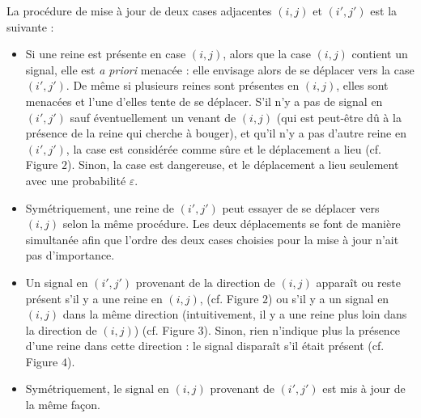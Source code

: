 \documentclass[11pt, openany]{article}
\newcommand{\norm}[1]{\left\lVert#1\right\rVert}
\begin{document}
La procédure de mise à jour de deux cases adjacentes $(i,j)$  et $(i', j')$
 est la suivante : \begin{itemize} 


\item{ Si une reine est présente en case $(i,j)$, alors que la case $(i,j)$ contient un signal, elle est \emph{a priori} menacée : elle envisage alors de se déplacer vers la case $(i',j')$. De même si plusieurs reines sont présentes en $(i,j)$, elles sont menacées et l'une d'elles tente de se déplacer. S'il n'y a pas de signal en $(i',j')$ sauf éventuellement un venant de $(i,j)$ (qui est peut-être dû à la présence de la reine qui cherche à bouger), et qu'il n'y a pas d'autre reine en $(i',j')$, la case est considérée comme sûre et le déplacement a lieu (cf. Figure $2$). Sinon, la case est dangereuse, et le déplacement a lieu seulement avec une probabilité $\varepsilon$.
}

\item{ Symétriquement, une reine de $(i',j')$ peut essayer de se déplacer vers $(i,j)$ selon la même procédure. Les deux déplacements se font de manière simultanée afin que l'ordre des deux cases choisies pour la mise à jour n'ait pas d'importance.}

\item{%
Un signal en $(i',j')$ provenant de la direction de $(i,j)$ apparaît ou reste présent s'il y a une reine en $(i,j)$, (cf. Figure $2$) ou s'il y a un signal en $(i,j)$ dans la même direction (intuitivement, il y a une reine plus loin dans la direction de $(i,j)$) (cf. Figure $3$). Sinon, rien n'indique plus la présence d'une reine dans cette direction : le signal disparaît s'il était présent (cf. Figure $4$). }

\item{ Symétriquement, le signal en $(i,j)$ provenant de $(i', j')$ est mis à jour de la même façon.}
  


\end{itemize}
\bigskip
\end{document}
